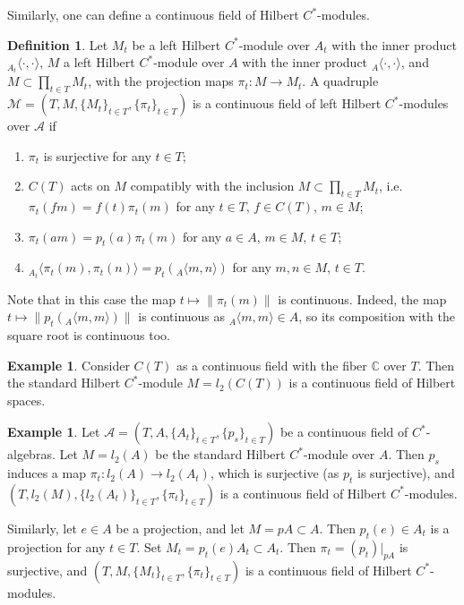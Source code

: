 \documentclass[12pt]{amsart}
\theoremstyle{definition}
\newtheorem{defn}[thm]{Definition}
\newtheorem{example}[thm]{Example}
\begin{document}
Similarly, one can define a continuous field of Hilbert $C^*$-modules.

\begin{defn}
Let $M_t$ be a left Hilbert $C^*$-module over $A_t$ with the inner product ${}_{A_t}\langle\cdot,\cdot\rangle$, $M$ a left Hilbert $C^*$-module over $A$ with the inner product ${}_{A}\langle\cdot,\cdot\rangle$, and $M\subset\prod_{t\in T}M_t$, with the projection maps $\pi_t:M\to M_t$. A quadruple $\mathcal M=(T,M,\{M_t\}_{t\in T},\{\pi_t\}_{t\in T})$ is a continuous field of left Hilbert $C^*$-modules over $\mathcal A$ if 
\begin{enumerate}
\item
$\pi_t$ is surjective for any $t\in T$; 
\item
$C(T)$ acts on $M$ compatibly with the inclusion $M\subset\prod_{t\in T}M_t$, i.e. $\pi_t(fm)=f(t)\pi_t(m)$ for any $t\in T$, $f\in C(T)$, $m\in M$;
\item
$\pi_t(am)=p_t(a)\pi_t(m)$ for any $a\in A$, $m\in M$, $t\in T$;
\item
${}_{A_t}\langle \pi_t(m),\pi_t(n)\rangle=p_t({}_A\langle m,n\rangle)$ for any $m,n\in M$, $t\in T$. 

\end{enumerate}

Note that in this case the map $t\mapsto\|\pi_t(m)\|$ is continuous. Indeed, the map $t\mapsto\|p_t({}_A\langle m,m\rangle)\|$ is continuous as ${}_A\langle m,m\rangle\in A$, so its composition with the square root is continuous too.

\end{defn}

\begin{example}
Consider $C(T)$ as a continuous field with the fiber $\mathbb C$ over $T$. Then the standard Hilbert $C^*$-module $M=l_2(C(T))$ is a continuous field of Hilbert spaces.

\end{example}

\begin{example}
Let $\mathcal A=(T,A,\{A_t\}_{t\in T},\{p_s\}_{t\in T})$ be a continuous field of $C^*$-algebras. 
Let $M=l_2(A)$ be the standard Hilbert $C^*$-module over $A$. Then $p_s$ induces a map $\pi_t:l_2(A)\to l_2(A_t)$, which is surjective (as $p_t$ is surjective), and $(T,l_2(M),\{l_2(A_t)\}_{t\in T},\{\pi_t\}_{t\in T})$ is a continuous field of Hilbert $C^*$-modules.

Similarly, let $e\in A$ be a projection, and let $M=pA\subset A$. Then $p_t(e)\in A_t$ is a projection for any $t\in T$. Set $M_t=p_t(e)A_t\subset A_t$. Then $\pi_t=(p_t)|_{pA}$ is surjective, and $(T,M,\{M_t\}_{t\in T},\{\pi_t\}_{t\in T})$ is a continuous field of Hilbert $C^*$-modules.

\end{example}
\end{document}
